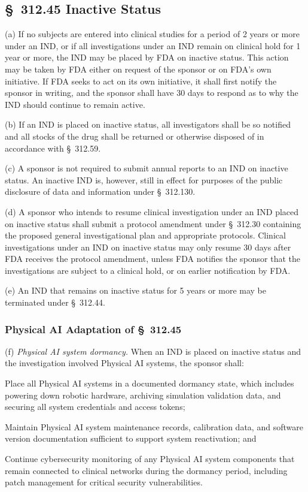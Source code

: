 
\subsection{\S~312.45 Inactive Status}

(a) If no subjects are entered into clinical studies for a period of 2 years or more under an IND, or if all investigations under an IND remain on clinical hold for 1 year or more, the IND may be placed by FDA on inactive status. This action may be taken by FDA either on request of the sponsor or on FDA's own initiative. If FDA seeks to act on its own initiative, it shall first notify the sponsor in writing, and the sponsor shall have 30 days to respond as to why the IND should continue to remain active.

(b) If an IND is placed on inactive status, all investigators shall be so notified and all stocks of the drug shall be returned or otherwise disposed of in accordance with \S~312.59.

(c) A sponsor is not required to submit annual reports to an IND on inactive status. An inactive IND is, however, still in effect for purposes of the public disclosure of data and information under \S~312.130.

(d) A sponsor who intends to resume clinical investigation under an IND placed on inactive status shall submit a protocol amendment under \S~312.30 containing the proposed general investigational plan and appropriate protocols. Clinical investigations under an IND on inactive status may only resume 30 days after FDA receives the protocol amendment, unless FDA notifies the sponsor that the investigations are subject to a clinical hold, or on earlier notification by FDA.

(e) An IND that remains on inactive status for 5 years or more may be terminated under \S~312.44.

\subsubsection{Physical AI Adaptation of \S~312.45}

(f) \textit{Physical AI system dormancy.} When an IND is placed on inactive status and the investigation involved Physical AI systems, the sponsor shall:

\begin{description}[leftmargin=0.8cm,style=sameline]
\item[(i)] Place all Physical AI systems in a documented dormancy state, which includes powering down robotic hardware, archiving simulation validation data, and securing all system credentials and access tokens;
\item[(ii)] Maintain Physical AI system maintenance records, calibration data, and software version documentation sufficient to support system reactivation; and
\item[(iii)] Continue cybersecurity monitoring of any Physical AI system components that remain connected to clinical networks during the dormancy period, including patch management for critical security vulnerabilities.
\end{description}

